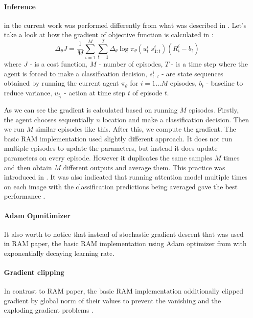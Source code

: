 {\paragraph{Inference} in the current work was performed differently from what was
described in \cite{DBLP:journals/corr/MnihHGK14}.
Let's take a look at how the gradient of objective function is calculated in \cite{DBLP:journals/corr/MnihHGK14}:
\begin{equation} \label{eq:}
	\Delta_{\theta} J = \frac{1}{M} \sum_{i=1}^M \sum_{t=1}^T
		\Delta_{\theta} \log \pi_{\theta}(u_t^i| s_{1:t}^i) (R_t^i - b_t)
\end{equation}
where $J$ - is a cost function, $M$ - number of episodes,
$T$ - is a time step where the agent is forced to make a classification decision,
$s_{1:t}^i$ - are state sequences obtained by
running the current agent $\pi_{\theta}$ for $i = 1 . . .M$ episodes,
$b_t$ - baseline to reduce variance, $u_t_i$ - action at time step $t$
of episode $t$.

As we can see the gradient is calculated based on running $M$ episodes.
Firstly, the agent chooses sequentially $n$ location and make a classification
decision. Then we run $M$ similar episodes like this. After this,
we compute the gradient. The basic RAM implementation used slightly different
approach. It does not run multiple episodes to update the parameters, but instead
it does update parameters on every episode. However it duplicates the same
samples $M$ times and then obtain $M$ different outputs and average them.
This practice was introduced in \cite{DBLP:journals/corr/BaMK14}.
It was also indicated that running attention model multiple times on each
image with the classification predictions being averaged gave the best
performance \cite{DBLP:journals/corr/BaMK14}.


\paragraph{Adam Opmitimizer} It also worth to notice that instead of stochastic
gradient descent that was used in RAM paper, the basic RAM implementation using Adam optimizer
from \cite{DBLP:journals/corr/KingmaB14} with exponentially decaying learning rate.


\paragraph{Gradient clipping} In contrast to RAM paper, the basic RAM implementation
additionally clipped gradient by global norm of their values to prevent the vanishing
and the exploding gradient problems \cite{Pascanu2012}.


}
